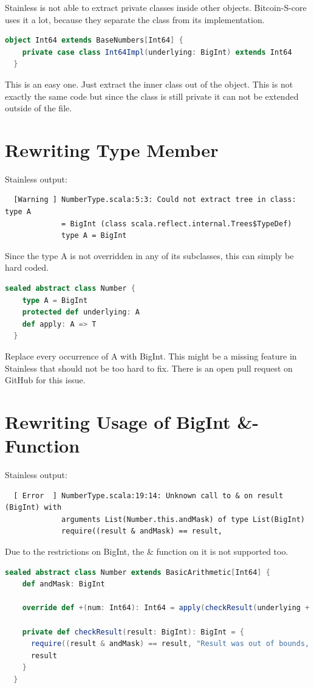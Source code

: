 Stainless is not able to extract private classes inside other objects.
Bitcoin-S-core uses it a lot, because they separate the class from its implementation.
\begin{lstlisting}[language=scala]
  object Int64 extends BaseNumbers[Int64] {
    private case class Int64Impl(underlying: BigInt) extends Int64 
  }
\end{lstlisting}

This is an easy one.
Just extract the inner class out of the object.
This is not exactly the same code but since the class is still private it can not be extended outside of the file.


\section{Rewriting Type Member}
Stainless output:
\begin{verbatim}
  [Warning ] NumberType.scala:5:3: Could not extract tree in class: type A
             = BigInt (class scala.reflect.internal.Trees$TypeDef)
             type A = BigInt
\end{verbatim}

Since the type A is not overridden in any of its subclasses, this can simply be hard coded.
\begin{lstlisting}[language=scala]
  sealed abstract class Number {
    type A = BigInt
    protected def underlying: A
    def apply: A => T
  }
\end{lstlisting}

Replace every occurrence of A with BigInt.
This might be a missing feature in Stainless that should not be too hard to fix.
There is an open pull request  on GitHub for this issue.


\section{Rewriting Usage of BigInt \&-Function}
Stainless output:
\begin{verbatim}
  [ Error  ] NumberType.scala:19:14: Unknown call to & on result (BigInt) with
             arguments List(Number.this.andMask) of type List(BigInt)
             require((result & andMask) == result,
\end{verbatim}

Due to the restrictions on BigInt, the \& function on it is not supported too.
\begin{lstlisting}[language=scala]
  sealed abstract class Number extends BasicArithmetic[Int64] {
    def andMask: BigInt

    override def +(num: Int64): Int64 = apply(checkResult(underlying + num.underlying))

    private def checkResult(result: BigInt): BigInt = {
      require((result & andMask) == result, "Result was out of bounds, got: " + result)
      result
    }
  }
\end{lstlisting}

